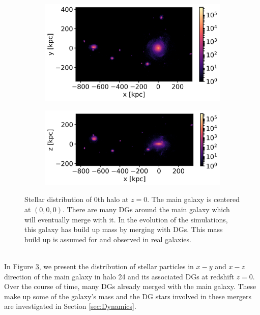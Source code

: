 \begin{figure}[htbp]
\captionsetup{format=plain}
    \centering
    \begin{subfigure}[b]{0.8\textwidth}
	    \includegraphics[width=\textwidth]{plots/Auriga/Au24_stars_xy_distribution_halo0.png}
	    \label{fig:Au24_stars_xy}
    \end{subfigure}
    
    \begin{subfigure}[b]{0.8\textwidth}
    \centering
    	\includegraphics[width=\textwidth]{plots/Auriga/Au24_stars_xz_distribution_halo0.png}
    	\label{fig:Au24_stars_xz}
    \end{subfigure}
    \caption{Stellar distribution of 0th halo at $\textit{z}=0$. The main galaxy is centered at $(0,0,0)$. There are many \acp{DG} around the main galaxy which will eventually merge with it. In the evolution of the simulations, this galaxy has build up mass by merging with \acp{DG}. This mass build up is assumed for and observed in real galaxies.}\label{fig:Stars_AU24}
\end{figure}
\\In Figure \ref{fig:Stars_AU24}, we present the distribution of stellar particles in $x-y$ and $x-z$ direction of the main galaxy in halo 24 and its associated \acp{DG} at redshift $z=0$. Over the course of time, many \acp{DG} already merged with the main galaxy. These make up some of the galaxy's mass and the \ac{DG} stars involved in these mergers are investigated in Section \ref{sec:Dynamics}.\\
